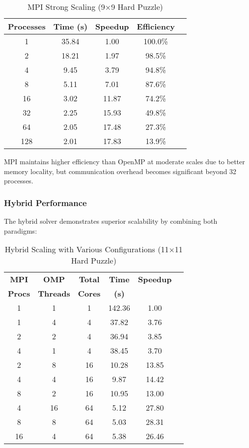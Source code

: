 \begin{table}[htbp]
\caption{MPI Strong Scaling (9×9 Hard Puzzle)}
\begin{center}
\begin{tabular}{@{}ccccc@{}}
\toprule
\textbf{Processes} & \textbf{Time (s)} & \textbf{Speedup} & \textbf{Efficiency} \\
\midrule
1 & 35.84 & 1.00 & 100.0\% \\
2 & 18.21 & 1.97 & 98.5\% \\
4 & 9.45 & 3.79 & 94.8\% \\
8 & 5.11 & 7.01 & 87.6\% \\
16 & 3.02 & 11.87 & 74.2\% \\
32 & 2.25 & 15.93 & 49.8\% \\
64 & 2.05 & 17.48 & 27.3\% \\
128 & 2.01 & 17.83 & 13.9\% \\
\bottomrule
\end{tabular}
\end{center}
\label{tab:mpi_scaling}
\end{table}

MPI maintains higher efficiency than OpenMP at moderate scales due to better memory locality, but communication overhead becomes significant beyond 32 processes.

\subsubsection{Hybrid Performance}
The hybrid solver demonstrates superior scalability by combining both paradigms:

\begin{table}[htbp]
\caption{Hybrid Scaling with Various Configurations (11×11 Hard Puzzle)}
\begin{center}
\begin{tabular}{@{}cccccc@{}}
\toprule
\textbf{MPI} & \textbf{OMP} & \textbf{Total} & \textbf{Time} & \textbf{Speedup} \\
\textbf{Procs} & \textbf{Threads} & \textbf{Cores} & \textbf{(s)} & \\
\midrule
1 & 1 & 1 & 142.36 & 1.00 \\
1 & 4 & 4 & 37.82 & 3.76 \\
2 & 2 & 4 & 36.94 & 3.85 \\
4 & 1 & 4 & 38.45 & 3.70 \\
2 & 8 & 16 & 10.28 & 13.85 \\
4 & 4 & 16 & 9.87 & 14.42 \\
8 & 2 & 16 & 10.95 & 13.00 \\
4 & 16 & 64 & 5.12 & 27.80 \\
8 & 8 & 64 & 5.03 & 28.31 \\
16 & 4 & 64 & 5.38 & 26.46 \\
\bottomrule
\end{tabular}
\end{center}
\label{tab:hybrid_scaling}
\end{table}

